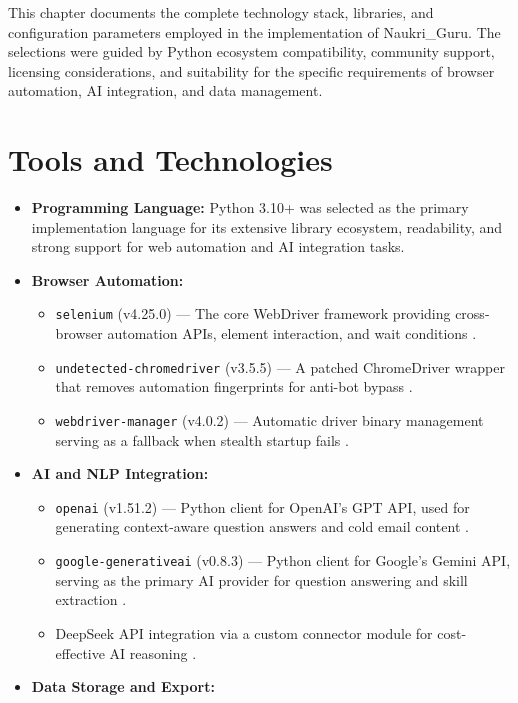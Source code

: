 \documentclass[12pt, a4paper, oneside]{report}
\begin{document}
This chapter documents the complete technology stack, libraries, and configuration parameters employed in the implementation of Naukri\_Guru. The selections were guided by Python ecosystem compatibility, community support, licensing considerations, and suitability for the specific requirements of browser automation, AI integration, and data management.

\section{Tools and Technologies}
\label{sec:tools}

\begin{itemize}
    \item \textbf{Programming Language:} Python 3.10+ was selected as the primary implementation language for its extensive library ecosystem, readability, and strong support for web automation and AI integration tasks.
    \item \textbf{Browser Automation:}
    \begin{itemize}
        \item \texttt{selenium} (v4.25.0) --- The core WebDriver framework providing cross-browser automation APIs, element interaction, and wait conditions \cite{ref5}.
        \item \texttt{undetected-chromedriver} (v3.5.5) --- A patched ChromeDriver wrapper that removes automation fingerprints for anti-bot bypass \cite{ref7}.
        \item \texttt{webdriver-manager} (v4.0.2) --- Automatic driver binary management serving as a fallback when stealth startup fails \cite{ref10}.
    \end{itemize}
    \item \textbf{AI and NLP Integration:}
    \begin{itemize}
        \item \texttt{openai} (v1.51.2) --- Python client for OpenAI's GPT API, used for generating context-aware question answers and cold email content \cite{ref8}.
        \item \texttt{google-generativeai} (v0.8.3) --- Python client for Google's Gemini API, serving as the primary AI provider for question answering and skill extraction \cite{ref11}.
        \item DeepSeek API integration via a custom connector module for cost-effective AI reasoning \cite{ref12}.
    \end{itemize}
    \item \textbf{Data Storage and Export:}

\end{itemize}
\end{document}
